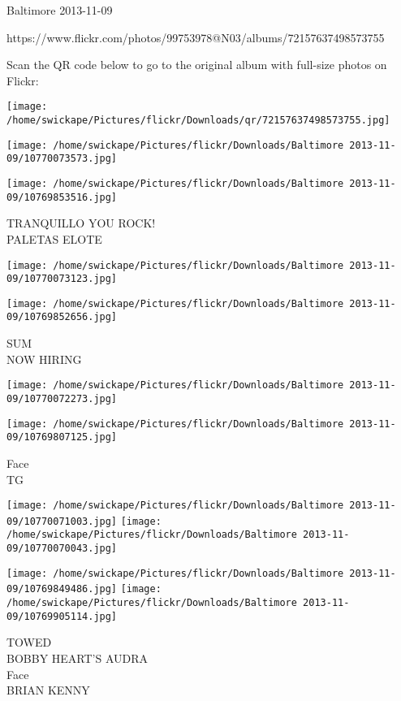\documentclass[10pt,letterpaper]{article}
\begin{document}
Baltimore 2013-11-09

https://www.flickr.com/photos/99753978@N03/albums/72157637498573755

Scan the QR code below to go to the original album with full-size photos on Flickr:

\texttt{[image: /home/swickape/Pictures/flickr/Downloads/qr/72157637498573755.jpg]}
\pagebreak

\texttt{[image: /home/swickape/Pictures/flickr/Downloads/Baltimore 2013-11-09/10770073573.jpg]}

\vspace{0.25in}
\texttt{[image: /home/swickape/Pictures/flickr/Downloads/Baltimore 2013-11-09/10769853516.jpg]}

TRANQUILLO YOU ROCK!\\
PALETAS ELOTE\\
\pagebreak

\texttt{[image: /home/swickape/Pictures/flickr/Downloads/Baltimore 2013-11-09/10770073123.jpg]}

\vspace{0.25in}
\texttt{[image: /home/swickape/Pictures/flickr/Downloads/Baltimore 2013-11-09/10769852656.jpg]}

SUM\\
NOW HIRING\\
\pagebreak

\texttt{[image: /home/swickape/Pictures/flickr/Downloads/Baltimore 2013-11-09/10770072273.jpg]}

\vspace{0.25in}
\texttt{[image: /home/swickape/Pictures/flickr/Downloads/Baltimore 2013-11-09/10769807125.jpg]}

Face\\
TG\\
\pagebreak

\texttt{[image: /home/swickape/Pictures/flickr/Downloads/Baltimore 2013-11-09/10770071003.jpg]}
\texttt{[image: /home/swickape/Pictures/flickr/Downloads/Baltimore 2013-11-09/10770070043.jpg]}

\texttt{[image: /home/swickape/Pictures/flickr/Downloads/Baltimore 2013-11-09/10769849486.jpg]}
\texttt{[image: /home/swickape/Pictures/flickr/Downloads/Baltimore 2013-11-09/10769905114.jpg]}

TOWED\\
BOBBY HEART'S AUDRA\\
Face\\
BRIAN KENNY\\
\pagebreak
\end{document}
